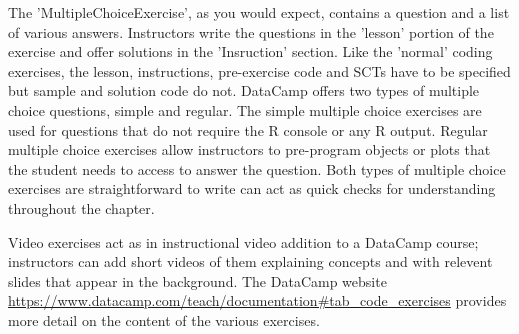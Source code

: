 \documentclass[12pt]{article}
\begin{document}
The 'MultipleChoiceExercise', as you would expect, contains a question and a list of various answers. Instructors write the questions in the 'lesson'
portion of the exercise and offer solutions in the 'Insruction' section. Like the 'normal' coding exercises, the lesson, instructions, pre-exercise 
code and SCTs have to be specified but sample and solution code do not. DataCamp offers two types of multiple choice questions, simple and regular. 
The simple multiple choice exercises are used for questions that do not require the R console or any R output. Regular multiple choice exercises 
allow instructors to pre-program objects or plots that the student needs to access to answer the question. Both types of multiple choice exercises 
are straightforward to write can act as quick checks for understanding throughout the chapter.


Video exercises act as in instructional video addition to a DataCamp course; instructors can add short videos of them explaining concepts and with 
relevent slides that appear in the background. The DataCamp website \url{https://www.datacamp.com/teach/documentation#tab_code_exercises} provides 
more detail on the content of the various exercises. 







%


\end{document}
